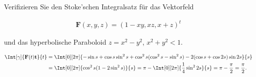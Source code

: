 
\begin{exercise}

Verifizieren Sie den Stoke'schen Integralsatz für das Vektorfeld

\begin{align*}
    \mathbf F(x, y, z)
    =
    (1 - x y, x z, x + z)^t
\end{align*}

und das hyperbolische Paraboloid $z = x^2 - y^2$, $x^2 + y^2 < 1$.

\begin{align*}
    \Int[\gamma]
    {
        \mathbf F(t) \mathbf t
    }{t}
    & =
    \Int[0][2 \pi]
    {
        -
        \sin s + \cos s \sin^2 s
        +
        \cos^2 s (\cos^2 s - \sin^2 s)
        -
        2 (\cos s + \cos{2 s}) \sin{2 s}
    }{s} \\
    & =
    \Int[0][2 \pi]
    {
        \cos^2 s (1 - 2 \sin^2 s)
    }{s}
    =
    \pi
    -
    \Int[0][2 \pi]
    {
        \frac{1}{4}
        \sin^2{2 s}
    }{s}
    =
    \pi - \frac{\pi}{2}
    =
    \frac{\pi}{2}.
\end{align*}

\end{exercise}


